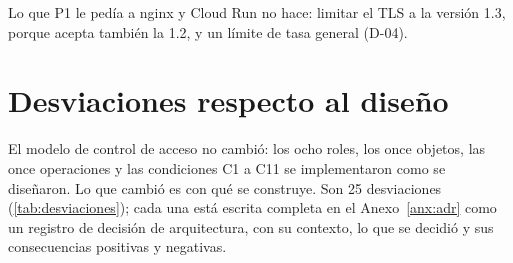 \documentclass[11pt,a4paper]{article}
\theoremstyle{definition}
\theoremstyle{remark}
\begin{document}
Lo que P1 le ped\'ia a nginx y Cloud Run no hace: limitar el TLS a la versi\'on
1.3, porque acepta tambi\'en la 1.2, y un l\'imite de tasa general (D-04).

%
\section{Desviaciones respecto al dise\~no}
\label{sec:desviaciones}

El modelo de control de acceso no cambi\'o: los ocho roles, los once objetos,
las once operaciones y las condiciones C1 a C11 se implementaron como se
dise\~naron. Lo que cambi\'o es con qu\'e se construye. Son 25 desviaciones
(\cref{tab:desviaciones}); cada una est\'a escrita completa en el
Anexo~\ref{anx:adr} como un registro de decisi\'on de arquitectura, con su contexto,
lo que se decidi\'o y sus consecuencias positivas y negativas.
\end{document}

